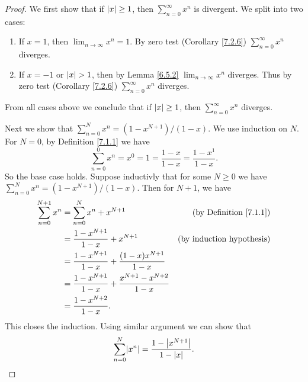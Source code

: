 \begin{proof}
    We first show that if \(\abs*{x} \geq 1\), then \(\sum_{n = 0}^\infty x^n\) is divergent.
    We split into two cases:
    \begin{enumerate}
        \item If \(x = 1\), then \(\lim_{n \to \infty} x^n = 1\). By zero test (Corollary \ref{7.2.6}) \(\sum_{n = 0}^\infty x^n\) diverges.
        \item If \(x = -1\) or \(\abs*{x} > 1\), then by Lemma \ref{6.5.2} \(\lim_{n \to \infty} x^n\) diverges.
              Thus by zero test (Corollary \ref{7.2.6}) \(\sum_{n = 0}^\infty x^n\) diverges.
    \end{enumerate}
    From all cases above we conclude that if \(\abs*{x} \geq 1\), then \(\sum_{n = 0}^\infty x^n\) diverges.

    Next we show that \(\sum_{n = 0}^N x^n = (1 - x^{N + 1}) / (1 - x)\).
    We use induction on \(N\).
    For \(N = 0\), by Definition \ref{7.1.1} we have
    \[
        \sum_{n = 0}^0 x^n = x^0 = 1 = \frac{1 - x}{1 - x} = \frac{1 - x^1}{1 - x}.
    \]
    So the base case holds.
    Suppose inductivly that for some \(N \geq 0\) we have \(\sum_{n = 0}^N x^n = (1 - x^{N + 1}) / (1 - x)\).
    Then for \(N + 1\), we have
    \begin{align*}
        \sum_{n = 0}^{N + 1} x^n & = \sum_{n = 0}^N x^n + x^{N + 1}                                    & \text{(by Definition \ref{7.1.1})} \\
                                 & = \frac{1 - x^{N + 1}}{1 - x} + x^{N + 1}                           & \text{(by induction hypothesis)}   \\
                                 & = \frac{1 - x^{N + 1}}{1 - x} + \frac{(1 - x) x^{N + 1}}{1 - x}                                          \\
                                 & = \frac{1 - x^{N + 1}}{1 - x} + \frac{x^{N + 1} - x^{N + 2}}{1 - x}                                      \\
                                 & = \frac{1 - x^{N + 2}}{1 - x}.
    \end{align*}
    This closes the induction.
    Using similar argument we can show that
    \[
        \sum_{n = 0}^N \abs*{x^n} = \frac{1 - \abs*{x^{N + 1}}}{1 - \abs*{x}}.
    \]


\end{proof}
